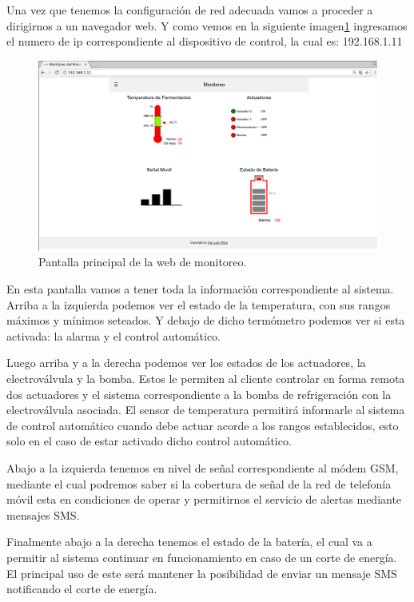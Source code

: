 Una vez que tenemos la configuración de red adecuada vamos a proceder a dirigirnos a un navegador web. Y como vemos en la siguiente imagen\ref{fig:web_monitoreo} ingresamos el numero de ip correspondiente al dispositivo de control, la cual es: 192.168.1.11 

\begin{figure}[h]
  \centering
  \includegraphics[scale=.25]{./Figures/web_monitoreo.png}
  \caption{Pantalla principal de la web de monitoreo.}
  \label{fig:web_monitoreo}
\end{figure}

En esta pantalla vamos a tener toda la información correspondiente al sistema. Arriba a la izquierda podemos ver el estado de la temperatura, con sus rangos máximos y mínimos seteados. Y debajo de dicho termómetro podemos ver si esta activada: la alarma y el control automático.

Luego arriba y a la derecha podemos ver los estados de los actuadores, la electroválvula y la bomba. Estos le permiten al cliente controlar en forma remota dos actuadores y el sistema correspondiente a la bomba de refrigeración con la electroválvula asociada. El sensor de temperatura permitirá informarle al sistema de control automático cuando debe actuar acorde a los rangos establecidos, esto solo en el caso de estar activado dicho control automático. 

Abajo a la izquierda tenemos en nivel de señal correspondiente al módem GSM, mediante el cual podremos saber si la cobertura de señal de la red de telefonía móvil esta en condiciones de operar y permitirnos el servicio de alertas mediante mensajes SMS. 

Finalmente abajo a la derecha tenemos el estado de la batería, el cual va a permitir al sistema continuar en funcionamiento en caso de un corte de energía. El principal uso de este será mantener la posibilidad de enviar un mensaje SMS notificando el corte de energía.

